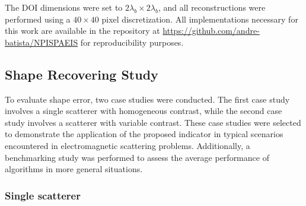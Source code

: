 \documentclass{IEEEtran}
\begin{document}
        The DOI dimensions were set to $2\lambda_b \times 2\lambda_b$, and all reconstructions were performed using a $40 \times 40$ pixel discretization. All implementations necessary for this work are available in the repository at \url{https://github.com/andre-batista/NPISPAEIS} for reproducibility purposes.

		\subsection{Shape Recovering Study}\label{sec:results:shape}
		

            To evaluate shape error, two case studies were conducted. The first case study involves a single scatterer with homogeneous contrast, while the second case study involves a scatterer with variable contrast. These case studies were selected to demonstrate the application of the proposed indicator in typical scenarios encountered in electromagnetic scattering problems. Additionally, a benchmarking study was performed to assess the average performance of algorithms in more general situations.
			

			\subsubsection{Single scatterer}\label{sec:results:shape:star}

\end{document}
